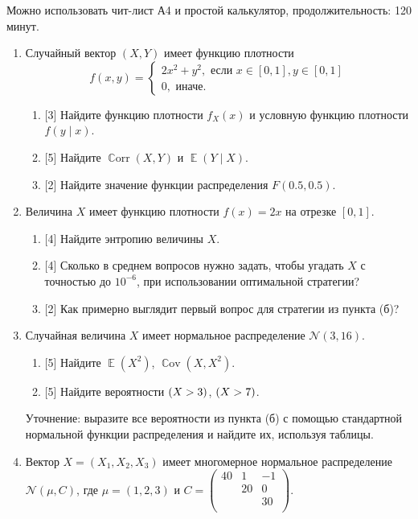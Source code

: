\documentclass[12pt]{article}
\DeclareMathOperator{\Cov}{\mathbb{C}ov}
\DeclareMathOperator{\Corr}{\mathbb{C}orr}
\let\P\relax
\DeclareMathOperator{\P}{\mathbb{P}}
\DeclareMathOperator{\E}{\mathbb{E}}
\newcommand \cN{\mathcal{N}}
\begin{document}
Можно использовать чит-лист А4 и простой калькулятор, продолжительность: 120 минут.

\begin{enumerate}

    \item %
    Случайный вектор $(X, Y)$ имеет функцию плотности 
    \[
    f(x, y) = \begin{cases}
        2x^2 + y^2, \text{ если } x\in[0, 1], y \in [0, 1] \\
        0, \text{ иначе}.    
    \end{cases}
    \]
    \begin{enumerate}
        \item {[3]} Найдите функцию плотности $f_X(x)$ и условную функцию плотности $f(y \mid x)$.
        \item {[5]} Найдите $\Corr(X, Y)$ и $\E(Y \mid X)$.
        \item {[2]} Найдите значение функции распределения $F(0.5, 0.5)$.
    \end{enumerate}
    
    

    \item %
Величина $X$ имеет функцию плотности $f(x) = 2x$ на отрезке $[0, 1]$.
\begin{enumerate}
    \item {[4]} Найдите энтропию величины $X$.
    \item {[4]} Сколько в среднем вопросов нужно задать, чтобы угадать $X$ с точностью до $10^{-6}$, при использовании оптимальной стратегии?
    \item {[2]} Как примерно выглядит первый вопрос для стратегии из пункта (б)?
\end{enumerate}


    \item %
    Случайная величина $X$ имеет нормальное распределение $\cN(3, 16)$. 
    \begin{enumerate}
        \item {[5]} Найдите $\E(X^2)$, $\Cov(X, X^2)$.
        \item {[5]} Найдите вероятности $\P(X > 3)$, $\P(X > 7)$.
    \end{enumerate}

    Уточнение: выразите все вероятности из пункта (б) с помощью стандартной нормальной функции распределения и найдите их, используя таблицы.
    
    \item %
    Вектор $X = (X_1, X_2, X_3)$ имеет многомерное нормальное распределение $\cN(\mu, C)$,
    где $\mu = (1, 2, 3)$ и $C = \begin{pmatrix}
        40 & 1 & -1 \\
         & 20 & 0 \\
         & & 30 \\
    \end{pmatrix}$. 


\end{enumerate}
\end{document}

